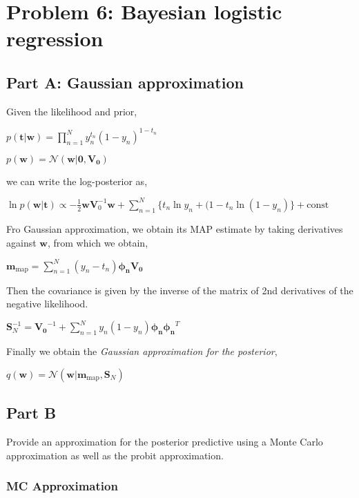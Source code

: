 \documentclass[11pt]{article}
\begin{document}
    \hypertarget{problem-6-bayesian-logistic-regression}{%
\section{Problem 6: Bayesian logistic
regression}\label{problem-6-bayesian-logistic-regression}}

    \hypertarget{part-a-gaussian-approximation}{%
\subsection{Part A: Gaussian
approximation}\label{part-a-gaussian-approximation}}

    Given the likelihood and prior,

\(p(\mathbf{t}|\mathbf{w}) = \prod_{n=1}^N y_n^{t_n}(1-y_n)^{1-t_n}\)

\(p(\mathbf{w}) = \mathcal{N}(\mathbf{w}|\mathbf{0},\mathbf{V_0})\)

we can write the log-posterior as,

\(\ln p(\mathbf{w}|\mathbf{t}) \propto -\frac{1}{2}\mathbf{w}\mathbf{V}_0^{-1}\mathbf{w} + \sum_{n=1}^N\{t_n\ln y_n + (1-t_n\ln (1-y_n)\} + \text{const}\)

Fro Gaussian approximation, we obtain its MAP estimate by taking
derivatives against \(\mathbf{w}\), from which we obtain,

\(\mathbf{m}_{\text{map}} = \sum_{n=1}^N (y_n - t_n)\boldsymbol{\phi_n}\mathbf{V_0}\)

Then the covariance is given by the inverse of the matrix of 2nd
derivatives of the negative likelihood.

\(\mathbf{S}_N^{-1} = \mathbf{V_0}^{-1} + \sum_{n=1}^N y_n(1-y_n)\boldsymbol{\phi_n}\boldsymbol{\phi_n}^T\)

Finally we obtain the \emph{Gaussian approximation for the posterior},

\(q(\mathbf{w}) = \mathcal{N}(\mathbf{w}|\mathbf{m}_\text{map}, \mathbf{S}_N)\)

    \hypertarget{part-b}{%
\subsection{Part B}\label{part-b}}

Provide an approximation for the posterior predictive using a Monte
Carlo approximation as well as the probit approximation.

    \hypertarget{mc-approximation}{%
\subsubsection{MC Approximation}\label{mc-approximation}}
\end{document}
